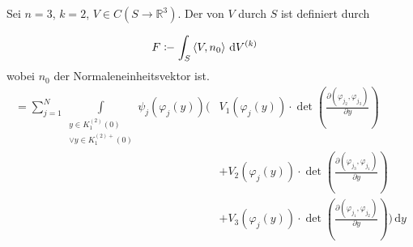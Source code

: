 \begin{theorem}[Fluss] \label{thm:12.3}
  Sei $n=3$, $k=2$, $V \in C(S \to \mathbb{R}^3)$. Der  von $V$ durch $S$ ist definiert durch
  
  \begin{align*}
    F &\coloneq \int_S \braket{V,n_0} \, \mathrm{d}V^{(k)}
  \end{align*}
  wobei $n_0$ der Normaleneinheitsvektor ist.
  \begin{align*}
    = \sum\limits_{j=1}^{N}
    \int\limits_{\substack{y \in K_1^{(2)}(0) \\ \lor y \in K_1^{(2)+}(0)}}
    \psi_j(\varphi_j(y)) \Bigg(
      & V_1(\varphi_j(y)) \cdot \det\left( \frac{\partial(\varphi_{j_2},\varphi_{j_3})}{\partial y} \right) \\
      &+ V_2(\varphi_j(y)) \cdot \det\left( \frac{\partial(\varphi_{j_3},\varphi_{j_1})}{\partial y} \right) \\
      &+ V_3(\varphi_j(y)) \cdot \det\left( \frac{\partial(\varphi_{j_1},\varphi_{j_2})}{\partial y} \right)
    \Bigg)
    \, \mathrm{d}y
  \end{align*}
\end{theorem}

